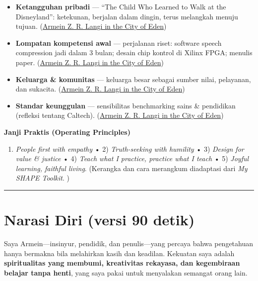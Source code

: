 \documentclass[
  letterpaper,
  DIV=11,
  numbers=noendperiod]{scrreprt}
\providecommand{\tightlist}{%
  \setlength{\itemsep}{0pt}\setlength{\parskip}{0pt}}
\begin{document}
\begin{itemize}
\tightlist
\item
  \textbf{Ketangguhan pribadi} --- ``The Child Who Learned to Walk at
  the Disneyland'': ketekunan, berjalan dalam dingin, terus melangkah
  menuju tujuan.
  (\href{https://ii-2100.github.io/all-about-me/My_Stories_for_You/index.html}{Armein
  Z. R. Langi in the City of Eden})
\item
  \textbf{Lompatan kompetensi awal} --- perjalanan riset: software
  speech compression jadi dalam 3 bulan; desain chip kontrol di Xilinx
  FPGA; menulis paper.
  (\href{https://ii-2100.github.io/all-about-me/My_Song_for_You/index.html}{Armein
  Z. R. Langi in the City of Eden})
\item
  \textbf{Keluarga \& komunitas} --- keluarga besar sebagai sumber
  nilai, pelayanan, dan sukacita.
  (\href{https://ii-2100.github.io/all-about-me/My_Shapes/index.html}{Armein
  Z. R. Langi in the City of Eden})
\item
  \textbf{Standar keunggulan} --- sensibilitas benchmarking sains \&
  pendidikan (refleksi tentang Caltech).
  (\href{https://ii-2100.github.io/all-about-me/My_Personal_Reviews/index.html}{Armein
  Z. R. Langi in the City of Eden})
\end{itemize}

\textbf{Janji Praktis (Operating Principles)}

\begin{enumerate}
\def\labelenumi{\arabic{enumi}.}
\tightlist
\item
  \emph{People first with empathy} • 2) \emph{Truth-seeking with
  humility} • 3) \emph{Design for value \& justice} • 4) \emph{Teach
  what I practice, practice what I teach} • 5) \emph{Joyful learning,
  faithful living}. (Kerangka dan cara merangkum diadaptasi dari
  \emph{My SHAPE Toolkit}. )
\end{enumerate}

\begin{center}\rule{0.5\linewidth}{0.5pt}\end{center}

\section{Narasi Diri (versi 90 detik)}\label{narasi-diri-versi-90-detik}

Saya Armein---insinyur, pendidik, dan penulis---yang percaya bahwa
pengetahuan hanya bermakna bila melahirkan kasih dan keadilan. Kekuatan
saya adalah \textbf{spiritualitas yang membumi, kreativitas rekayasa,
dan kegembiraan belajar tanpa henti}, yang saya pakai untuk menyalakan
semangat orang lain.
\end{document}
